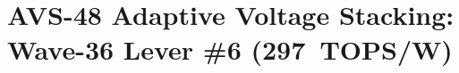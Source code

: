 %

\chapter{AVS-48 Adaptive Voltage Stacking: Wave-36 Lever \#6 (297~TOPS/W)}%
\label{ch:avs-voltage-stacking-wave36}

